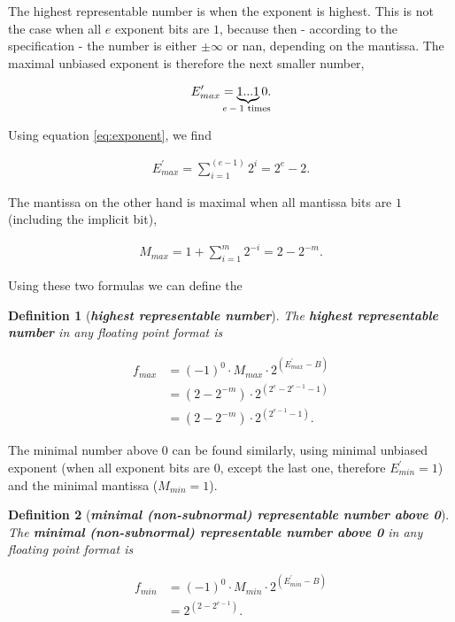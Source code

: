 \documentclass{article}
\theoremstyle{plain} %
\newtheorem{definition}{Definition}[section]
\theoremstyle{convention} %
\theoremstyle{remark} %
\def\df#1{\textbf{\textit{#1}}}
\numberwithin{equation}{section}
\begin{document}

The highest representable number is when the exponent is highest. This is not the case when all $e$ exponent bits are $1$, because then - according to the specification \cite{ieee754_1985} - the number is either $\pm \infty$ or \acrfull{nan}, depending on the mantissa. The maximal unbiased exponent is therefore the next smaller number,

\begin{align*}
    E^{\prime}_{max} = \underbrace{ 1...1 }_{\text{\makebox[0pt]{$e-1$ times} }}0.
\end{align*}

Using equation \eqref{eq:exponent}, we find

\begin{align*}
    E^{\prime}_{max} = \sum_{i=1}^{(e-1)} 2^i = 2^e -2.
\end{align*}

The mantissa on the other hand is maximal when all mantissa bits are $1$ (including the implicit bit),

\begin{align*}
    M_{max} = 1 + \sum_{i=1}^{m} 2^{-i} = 2 - 2^{-m}.
\end{align*}

Using these two formulas we can define the

\begin{definition}[\df{highest representable number}]

The \df{highest representable number} in any floating point format is

\begin{align*}
    f_{max} &= (-1)^0 \cdot M_{max} \cdot 2^{(E^{\prime}_{max} - B)} \\
            &= ( 2 - 2^{-m} ) \cdot 2^{(2^e -2^{e-1} -1)} \\
            &= ( 2 - 2^{-m} ) \cdot 2^{(2^{e-1} -1)}.
\end{align*}

\end{definition}

The minimal number above \num{0} can be found similarly, using minimal unbiased exponent (when all exponent bits are \num{0}, except the last one, therefore $E^{\prime}_{min} = 1$) and the minimal mantissa ($M_{min} = 1$).

\begin{definition}[\df{minimal (non-subnormal) representable number above \num{0}}]

The \df{minimal (non-subnormal) representable number above \num{0}} in any floating point format is

\begin{align*}
    f_{min} &= (-1)^0 \cdot M_{min} \cdot 2^{(E^{\prime}_{min} - B)} \\
            &= 2^{(2 - 2^{e-1})}.
\end{align*}

\end{definition}
\end{document}
